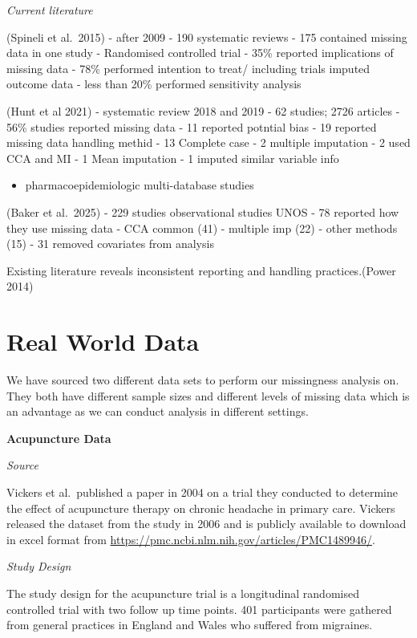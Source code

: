 \documentclass{article}
\providecommand{\tightlist}{%
  \setlength{\itemsep}{0pt}\setlength{\parskip}{0pt}}
\begin{document}
\emph{Current literature}

(Spineli et al.~2015) - after 2009 - 190 systematic reviews - 175
contained missing data in one study - Randomised controlled trial - 35\%
reported implications of missing data - 78\% performed intention to
treat/ including trials imputed outcome data - less than 20\% performed
sensitivity analysis

(Hunt et al 2021) - systematic review 2018 and 2019 - 62 studies; 2726
articles - 56\% studies reported missing data - 11 reported potntial
bias - 19 reported missing data handling methid - 13 Complete case - 2
multiple imputation - 2 used CCA and MI - 1 Mean imputation - 1 imputed
similar variable info

\begin{itemize}
\tightlist
\item
  pharmacoepidemiologic multi-database studies
\end{itemize}

(Baker et al.~2025) - 229 studies observational studies UNOS - 78
reported how they use missing data - CCA common (41) - multiple imp (22)
- other methods (15) - 31 removed covariates from analysis

Existing literature reveals inconsistent reporting and handling
practices.(Power 2014)

\section{Real World Data}\label{real-world-data}

We have sourced two different data sets to perform our missingness
analysis on. They both have different sample sizes and different levels
of missing data which is an advantage as we can conduct analysis in
different settings.

\textbf{Acupuncture Data}

\emph{Source}

Vickers et al.~published a paper in 2004 on a trial they conducted to
determine the effect of acupuncture therapy on chronic headache in
primary care. Vickers released the dataset from the study in 2006 and is
publicly available to download in excel format from
\url{https://pmc.ncbi.nlm.nih.gov/articles/PMC1489946/}.

\emph{Study Design}

The study design for the acupuncture trial is a longitudinal randomised
controlled trial with two follow up time points. 401 participants were
gathered from general practices in England and Wales who suffered from
migraines.
\end{document}
